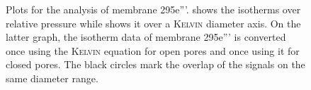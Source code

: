 \documentclass[../../../thesis.tex]{subfiles}
\begin{document}
\begin{figure}[tpb]
{
      \label{fig:295-e-200ald-kelvin}
    }
    \caption{Plots for the analysis of membrane 295e'''. \protect{} shows the isotherms over relative pressure while \protect{} shows it over a \textsc{Kelvin} diameter axis. On the latter graph, the isotherm data of membrane 295e''' is converted once using the \textsc{Kelvin} equation for open pores and once using it for closed pores. The black circles mark the overlap of the signals on the same diameter range. }
    \label{fig:295e-200ald}
  \end{figure}
\end{document}

